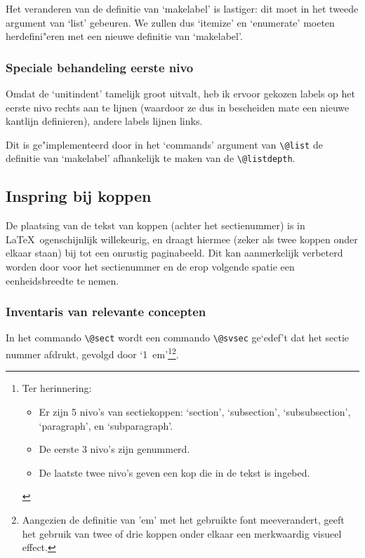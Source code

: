 \documentclass[a4paper]{artikel1} %
\begin{document}
Het veranderen van de definitie van `makelabel' is lastiger: dit moet
in het tweede argument van `list' gebeuren. We zullen dus `itemize' en
`enumerate' moeten herdefini"eren met een nieuwe definitie van
`makelabel'.
 
\subsubsection{Speciale behandeling eerste nivo}
 
Omdat de `unitindent' tamelijk groot uitvalt, heb ik ervoor gekozen
labels op het eerste nivo rechts aan te lijnen (waardoor ze dus in
bescheiden mate een nieuwe kantlijn definieren), andere labels lijnen
links.
 
Dit is ge"implementeerd door in het `commands' argument van
\verb.\@list. de definitie van `makelabel' afhankelijk te maken van de
\verb.\@listdepth..
 
 
 
\subsection{Inspring bij koppen}
 
De plaatsing van de tekst van koppen (achter het sectienummer) is in
\LaTeX\ ogenschijnlijk willekeurig, en draagt hiermee (zeker als twee
koppen onder elkaar staan) bij tot een onrustig paginabeeld. Dit kan
aanmerkelijk verbeterd worden door voor het sectienummer en de erop
volgende spatie een eenheidsbreedte te nemen.
 
\subsubsection{Inventaris van relevante concepten}
In het commando \verb.\@sect. wordt een commando \verb.\@svsec.
ge`edef't dat het sectie nummer afdrukt, gevolgd door
`1~em'\footnote{Ter herinnering:
 \begin{itemize}
 \item Er zijn 5 nivo's van sectiekoppen: `section', `subsection',
   `subsubsection', `paragraph', en `subparagraph'.
 \item De eerste 3 nivo's zijn genummerd.
 \item De laatste twee nivo's geven een kop die in de tekst is
 ingebed.
 \end{itemize}}\footnote{Aangezien de definitie van 'em' met het
 gebruikte font meeverandert, geeft het gebruik van twee of drie
 koppen onder elkaar een merkwaardig visueel effect.}.
 
\end{document}

